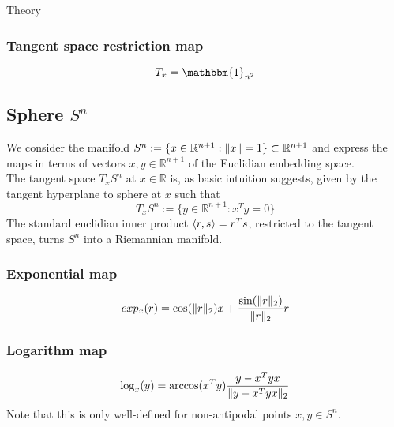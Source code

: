 \begin{chapter}{Theory}
\subsubsection{Tangent space restriction map} %
\label{ssub:TangentEUC}
\begin{equation}
    T_x=\mathbbm{1}_{n^2}
\end{equation}


\subsection{Sphere $S^n$} %
\label{sub:Sphere}
We consider the manifold $S^n:=\lbrace x\in\mathbb{R}^{n+1}: \| x \|=1\rbrace\subset\mathbb{R}^{n+1}$ and express the maps in terms of vectors $x,y\in\mathbb{R}^{n+1}$ of the Euclidian 
embedding space.\\
The tangent space $T_xS^n$ at $x\in\mathbb{R}$ is, as basic intuition suggests, given by the tangent hyperplane to sphere at $x$ such that
\begin{equation}
    \label{eq:sntangentspace}
    T_xS^n:=\lbrace y\in\mathbb{R}^{n+1}: x^Ty=0 \rbrace
\end{equation}
The standard euclidian inner product $\left\langle r,s \right\rangle=r^Ts$, restricted to the tangent space, turns $S^n$ into a Riemannian manifold.

\subsubsection{Exponential map} %
\label{ssub:ExponentialS2}
\begin{equation}
    exp_x(r)= \cos(\| r \|_2)x + \frac{\sin(\| r \|_{2})}{\| r \|_{2}}r 
\end{equation}

\subsubsection{Logarithm map} %
\label{ssub:LogarithmS2}
\begin{equation}
    \log_x(y)= \arccos(x^Ty)\frac{y-x^Tyx}{\| y-x^Tyx \|_2}
\end{equation}
Note that this is only well-defined for non-antipodal points $x,y\in S^n$.


\end{chapter}
